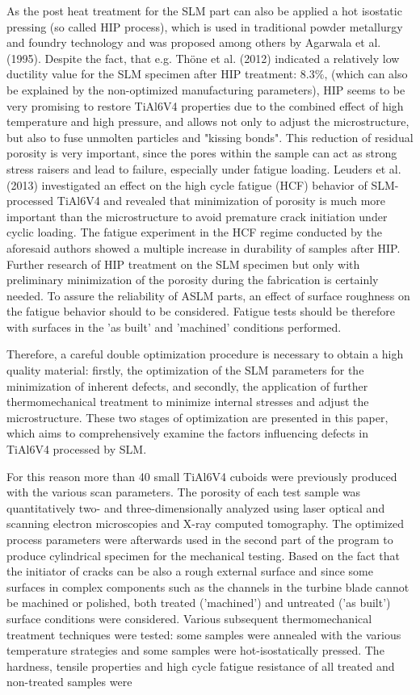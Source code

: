 \documentclass[10pt]{article}
\begin{document}
As the post heat treatment for the SLM part can also be applied a hot isostatic pressing (so called HIP process), which is used in traditional powder metallurgy and foundry technology and was proposed among others by Agarwala et al. (1995). Despite the fact, that e.g. Thöne et al. (2012) indicated a relatively low ductility value for the SLM specimen after HIP treatment: $8.3 \%$, (which can also be explained by the non-optimized manufacturing parameters), HIP seems to be very promising to restore TiAl6V4 properties due to the combined effect of high temperature and high pressure, and allows not only to adjust the microstructure, but also to fuse unmolten particles and "kissing bonds". This reduction of residual porosity is very important, since the pores within the sample can act as strong stress raisers and lead to failure, especially under fatigue loading. Leuders et al. (2013) investigated an effect on the high cycle fatigue (HCF) behavior of SLM-processed TiAl6V4 and revealed that minimization of porosity is much more important than the microstructure to avoid premature crack initiation under cyclic loading. The fatigue experiment in the HCF regime conducted by the aforesaid authors showed a multiple increase in durability of samples after HIP. Further research of HIP treatment on the SLM specimen but only with preliminary minimization of the porosity during the fabrication is certainly needed. To assure the reliability of ASLM parts, an effect of surface roughness on the fatigue behavior should to be considered. Fatigue tests should be therefore with surfaces in the 'as built' and 'machined' conditions performed.

Therefore, a careful double optimization procedure is necessary to obtain a high quality material: firstly, the optimization of the SLM parameters for the minimization of inherent defects, and secondly, the application of further thermomechanical treatment to minimize internal stresses and adjust the microstructure. These two stages of optimization are presented in this paper, which aims to comprehensively examine the factors influencing defects in TiAl6V4 processed by SLM.

For this reason more than 40 small TiAl6V4 cuboids were previously produced with the various scan parameters. The porosity of each test sample was quantitatively two- and three-dimensionally analyzed using laser optical and scanning electron microscopies and X-ray computed tomography. The optimized process parameters were afterwards used in the second part of the program to produce cylindrical specimen for the mechanical testing. Based on the fact that the initiator of cracks can be also a rough external surface and since some surfaces in complex components such as the channels in the turbine blade cannot be machined or polished, both treated ('machined') and untreated ('as built') surface conditions were considered. Various subsequent thermomechanical treatment techniques were tested: some samples were annealed with the various temperature strategies and some samples were hot-isostatically pressed. The hardness, tensile properties and high cycle fatigue resistance of all treated and non-treated samples were
\end{document}
